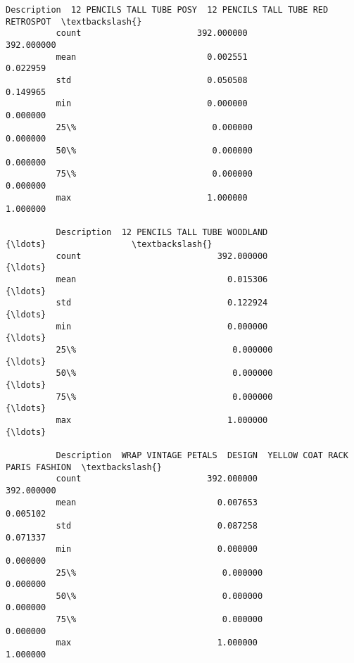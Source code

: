 \documentclass[11pt]{article}
\begin{document}
\begin{Verbatim}[commandchars=\\\{\}]
          Description  12 PENCILS TALL TUBE POSY  12 PENCILS TALL TUBE RED RETROSPOT  \textbackslash{}
          count                       392.000000                          392.000000   
          mean                          0.002551                            0.022959   
          std                           0.050508                            0.149965   
          min                           0.000000                            0.000000   
          25\%                           0.000000                            0.000000   
          50\%                           0.000000                            0.000000   
          75\%                           0.000000                            0.000000   
          max                           1.000000                            1.000000   
          
          Description  12 PENCILS TALL TUBE WOODLAND               {\ldots}                 \textbackslash{}
          count                           392.000000               {\ldots}                  
          mean                              0.015306               {\ldots}                  
          std                               0.122924               {\ldots}                  
          min                               0.000000               {\ldots}                  
          25\%                               0.000000               {\ldots}                  
          50\%                               0.000000               {\ldots}                  
          75\%                               0.000000               {\ldots}                  
          max                               1.000000               {\ldots}                  
          
          Description  WRAP VINTAGE PETALS  DESIGN  YELLOW COAT RACK PARIS FASHION  \textbackslash{}
          count                         392.000000                      392.000000   
          mean                            0.007653                        0.005102   
          std                             0.087258                        0.071337   
          min                             0.000000                        0.000000   
          25\%                             0.000000                        0.000000   
          50\%                             0.000000                        0.000000   
          75\%                             0.000000                        0.000000   
          max                             1.000000                        1.000000   
          

\end{Verbatim}
\end{document}
